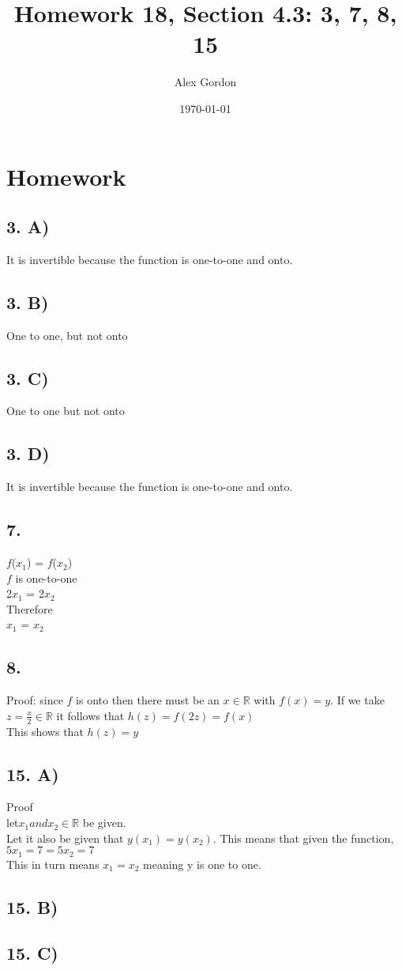 \documentclass[12]{scrartcl}
\begin{document}
\title{Homework 18, Section 4.3: 3, 7, 8, 15}
\author{Alex Gordon}
\date{\today}
\maketitle
\section*{Homework}
\subsection*{3. A)}
It is invertible because the function is one-to-one and onto.
\subsection*{3. B)}
One to one, but not onto
\subsection*{3. C)}
One to one but not onto
\subsection*{3. D)}
It is invertible because the function is one-to-one and onto.

\subsection*{7.}
$f$($x_{1}$) = $\textit{f}$($\textit{x}_{2}$)\\
$\textit{f}$ is one-to-one\\
2$\textit{x}_{1}$ = 2$\textit{x}_{2}$\\
Therefore\\
$\textit{x}_{1}$ = $\textit{x}_{2}$

\subsection*{8.}
Proof: 
 since $\textit{f}$ is onto then there must be an $x \in \mathds{R}$ with $f(x) = y.$ If we take $z = \frac{x}{2} \in \mathds{R}$ it follows that $h(z) = f(2z) = f(x)$\\ This shows that $h(z) = y$
\subsection*{15. A)}
Proof\\
let$x_1 and x_2 \in  \mathds{R}$ be given. \\
Let it also be given that $y(x_1) = y(x_2)$. This means that given the function, $5x_1 = 7 = 5x_2 = 7$\\
This in turn means $x_1 = x_2$ meaning y is one to one. 
\subsection*{15. B)}

\subsection*{15. C)}
\end{document}
